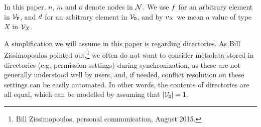 In this paper, $n$, $m$ and $o$ denote nodes in $\mathcal{N}$.
We use $f$ for an arbitrary element in $\mathcal{V}_{\mathtt{F}}$, 
and $d$ for an arbitrary element in $\mathcal{V}_{\mathtt{D}}$,
and by $v_X$ we mean a value of type $X$ in $\mathcal{V}_{X}$.


A simplification we will assume in this paper is regarding directories.
As Bill Zissimopoulos pointed 
out,\footnote{Bill Zissimopoulos, personal communication, August 2015.} 
we often do not want to consider metadata stored in
directories (e.g. permission settings) during synchronization,
as these are not generally understood well by users,
and, if needed, conflict resolution on these settings can be easily automated.
In other words, the contents of directories are all equal,
which can be modelled by assuming that $|\mathcal{V}_{\mathtt{D}}|=1$.
